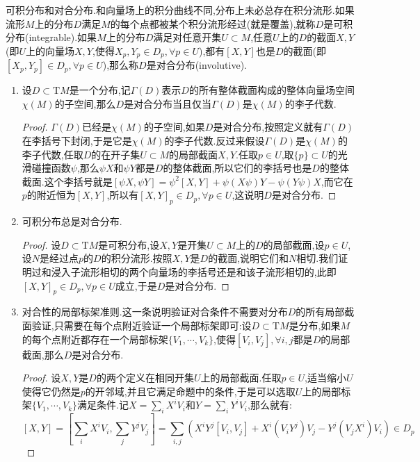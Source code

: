 可积分布和对合分布.和向量场上的积分曲线不同,分布上未必总存在积分流形.如果流形$M$上的分布$D$满足$M$的每个点都被某个积分流形经过(就是覆盖),就称$D$是可积分布(integrable).如果$M$上的分布$D$满足对任意开集$U\subset M$,任意$U$上的$D$的截面$X,Y$(即$U$上的向量场$X,Y$,使得$X_p,Y_p\in D_p,\forall p\in U$),都有$[X,Y]$也是$D$的截面(即$[X_p,Y_p]\in D_p,\forall p\in U$),那么称$D$是对合分布(involutive).
\begin{enumerate}
	\item 设$D\subset\mathrm{T}M$是一个分布,记$\Gamma(D)$表示$D$的所有整体截面构成的整体向量场空间$\chi(M)$的子空间,那么$D$是对合分布当且仅当$\Gamma(D)$是$\chi(M)$的李子代数.
	\begin{proof}
		
		$\Gamma(D)$已经是$\chi(M)$的子空间,如果$D$是对合分布,按照定义就有$\Gamma(D)$在李括号下封闭,于是它是$\chi(M)$的李子代数.反过来假设$\Gamma(D)$是$\chi(M)$的李子代数,任取$D$的在开子集$U\subset M$的局部截面$X,Y$.任取$p\in U$,取$\{p\}\subset U$的光滑碰撞函数$\psi$,那么$\psi X$和$\psi Y$都是$D$的整体截面,所以它们的李括号也是$D$的整体截面.这个李括号就是$[\psi X,\psi Y]=\psi^2[X,Y]+\psi(X\psi)Y-\psi(Y\psi)X$,而它在$p$的附近恒为$[X,Y]$,所以有$[X,Y]_p\in D_p,\forall p\in U$,这说明$D$是对合分布.
	\end{proof}
    \item 可积分布总是对合分布.
    \begin{proof}
    	
    	设$D\subset\mathrm{T}M$是可积分布,设$X,Y$是开集$U\subset M$上的$D$的局部截面,设$p\in U$,设$N$是经过点$p$的$D$的积分流形.按照$X,Y$是$D$的截面,说明它们和$N$相切.我们证明过和浸入子流形相切的两个向量场的李括号还是和该子流形相切的,此即$[X,Y]_p\in D_p,\forall p\in U$成立,于是$D$是对合分布.
    \end{proof}
    \item 对合性的局部标架准则.这一条说明验证对合条件不需要对分布$D$的所有局部截面验证,只需要在每个点附近验证一个局部标架即可:设$D\subset\mathrm{T}M$是分布,如果$M$的每个点附近都存在一个局部标架$\{V_1,\cdots,V_k\}$,使得$[V_i,V_j],\forall i,j$都是$D$的局部截面,那么$D$是对合分布.
    \begin{proof}
    	
    	设$X,Y$是$D$的两个定义在相同开集$U$上的局部截面.任取$p\in U$,适当缩小$U$使得它仍然是$p$的开邻域,并且它满足命题中的条件,于是可以选取$U$上的局部标架$\{V_1,\cdots,V_k\}$满足条件.记$X=\sum_iX^iV_i$和$Y=\sum_iY^iV_i$,那么就有:
    	$$[X,Y]=[\sum_iX^iV_i,\sum_jY^jV_j]=\sum_{i,j}\left(X^iY^j[V_i,V_j]+X^i(V_iY^j)V_j-Y^j(V_jX^i)V_i\right)\in D_p$$
    \end{proof}
\end{enumerate}

